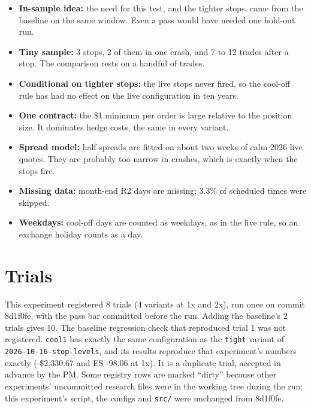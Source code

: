 \documentclass{article}
\begin{document}
\begin{itemize}

\item \textbf{In-sample idea:} the need for this test, and the tighter stops, came from the baseline on the same window. Even a pass would have needed one hold-out run.

\item \textbf{Tiny sample:} 3 stops, 2 of them in one crash, and 7 to 12 trades after a stop. The comparison rests on a handful of trades.

\item \textbf{Conditional on tighter stops:} the live stops never fired, so the cool-off rule has had no effect on the live configuration in ten years.

\item \textbf{One contract:} the \$1 minimum per order is large relative to the position size. It dominates hedge costs, the same in every variant.

\item \textbf{Spread model:} half-spreads are fitted on about two weeks of calm 2026 live quotes. They are probably too narrow in crashes, which is exactly when the stops fire.

\item \textbf{Missing data:} month-end R2 days are missing; 3.3\% of scheduled times were skipped.

\item \textbf{Weekdays:} cool-off days are counted as weekdays, as in the live rule, so an exchange holiday counts as a day.

\end{itemize}

\section{Trials}

This experiment registered 8 trials (4 variants at 1x and 2x), run once on commit 8d1f0fe, with the pass bar committed before the run. Adding the baseline's 2 trials gives 10. The baseline regression check that reproduced trial 1 was not registered. \texttt{cool1} has exactly the same configuration as the \texttt{tight} variant of \texttt{2026-\allowbreak{}10-\allowbreak{}16-\allowbreak{}stop-\allowbreak{}levels}, and its results reproduce that experiment's numbers exactly (-\$2,330.67 and ES -98.06 at 1x). It is a duplicate trial, accepted in advance by the PM. Some registry rows are marked ``dirty'' because other experiments' uncommitted research files were in the working tree during the run; this experiment's script, the configs and \texttt{src/\allowbreak{}} were unchanged from 8d1f0fe.
\end{document}
